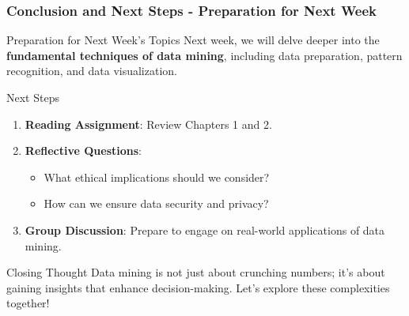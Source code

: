 \documentclass[aspectratio=169]{beamer}
\begin{document}
\begin{frame}[fragile]
    \frametitle{Conclusion and Next Steps - Preparation for Next Week}
    \begin{block}{Preparation for Next Week's Topics}
        Next week, we will delve deeper into the \textbf{fundamental techniques of data mining}, including data preparation, pattern recognition, and data visualization.
    \end{block}

    \begin{block}{Next Steps}
        \begin{enumerate}
            \item \textbf{Reading Assignment}: Review Chapters 1 and 2.
            \item \textbf{Reflective Questions}:
                \begin{itemize}
                    \item What ethical implications should we consider?
                    \item How can we ensure data security and privacy?
                \end{itemize}
            \item \textbf{Group Discussion}: Prepare to engage on real-world applications of data mining.
        \end{enumerate}
    \end{block}

    \begin{block}{Closing Thought}
        Data mining is not just about crunching numbers; it’s about gaining insights that enhance decision-making. Let's explore these complexities together!
    \end{block}
\end{frame}
\end{document}
